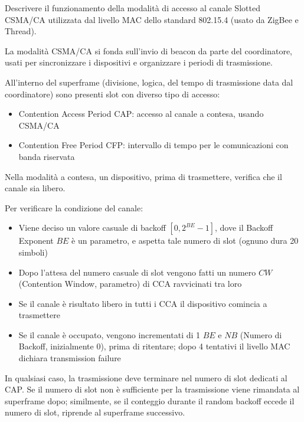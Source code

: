 \begin{questions}
    \question Descrivere il funzionamento della modalità di accesso al canale Slotted CSMA/CA utilizzata dal livello MAC dello standard 802.15.4 (usato da ZigBee e Thread).
    
    \begin{solution}
        La modalità CSMA/CA si fonda sull'invio di beacon da parte del coordinatore, usati per sincronizzare i dispositivi e organizzare i periodi di trasmissione.
        
        All'interno del superframe (divisione, logica, del tempo di trasmissione data dal coordinatore) sono presenti slot con diverso tipo di accesso: 
        \begin{itemize}
            \item Contention Access Period CAP: accesso al canale a contesa, usando CSMA/CA
            
            \item Contention Free Period CFP: intervallo di tempo per le comunicazioni con banda riservata
        \end{itemize}
        
        Nella modalità a contesa, un dispositivo, prima di trasmettere, verifica che il canale sia libero. 
        
        Per verificare la condizione del canale: 
        \begin{itemize}
            \item Viene deciso un valore casuale di backoff $[0, 2^{BE} - 1]$, dove il Backoff Exponent $BE$ è un parametro, e aspetta tale numero di slot (ognuno dura 20 simboli)
            
            \item Dopo l'attesa del numero casuale di slot vengono fatti un numero $CW$ (Contention Window, parametro) di CCA ravvicinati tra loro
            
            \item Se il canale è risultato libero in tutti i CCA il dispositivo comincia a trasmettere
            
            \item Se il canale è occupato, vengono incrementati di 1 $BE$ e $NB$ (Numero di Backoff, inizialmente 0), prima di ritentare; dopo 4 tentativi il livello MAC dichiara transmission failure
        \end{itemize}
        
        In qualsiasi caso, la trasmissione deve terminare nel numero di slot dedicati al CAP. Se il numero di slot non è sufficiente per la trasmissione viene rimandata al superframe dopo; similmente, se il conteggio durante il random backoff eccede il numero di slot, riprende al superframe successivo.
    \end{solution}
\end{questions}